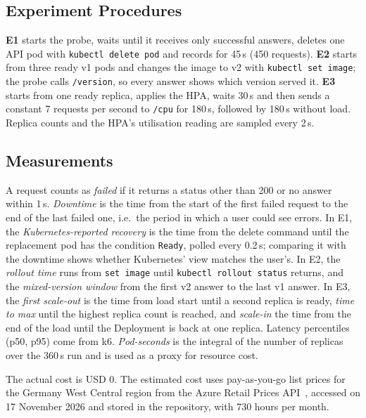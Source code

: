 \documentclass[conference,a4paper]{IEEEtran}
\begin{document}
\subsection{Experiment Procedures}
\textbf{E1} starts the probe, waits until it receives only successful answers, deletes one API pod with \texttt{kubectl delete pod} and records for 45\,s (450 requests). \textbf{E2} starts from three ready v1 pods and changes the image to v2 with \texttt{kubectl set image}; the probe calls \texttt{/version}, so every answer shows which version served it. \textbf{E3} starts from one ready replica, applies the HPA, waits 30\,s and then sends a constant 7 requests per second to \texttt{/cpu} for 180\,s, followed by 180\,s without load. Replica counts and the HPA's utilisation reading are sampled every 2\,s.

\subsection{Measurements}
A request counts as \emph{failed} if it returns a status other than 200 or no answer within 1\,s. \emph{Downtime} is the time from the start of the first failed request to the end of the last failed one, i.e.\ the period in which a user could see errors. In E1, the \emph{Kubernetes-reported recovery} is the time from the delete command until the replacement pod has the condition \texttt{Ready}, polled every 0.2\,s; comparing it with the downtime shows whether Kubernetes' view matches the user's. In E2, the \emph{rollout time} runs from \texttt{set image} until \texttt{kubectl rollout status} returns, and the \emph{mixed-version window} from the first v2 answer to the last v1 answer. In E3, the \emph{first scale-out} is the time from load start until a second replica is ready, \emph{time to max} until the highest replica count is reached, and \emph{scale-in} the time from the end of the load until the Deployment is back at one replica. Latency percentiles (p50, p95) come from k6. \emph{Pod-seconds} is the integral of the number of replicas over the 360\,s run and is used as a proxy for resource cost.

The actual cost is USD 0. The estimated cost uses pay-as-you-go list prices for the Germany West Central region from the Azure Retail Prices API~\cite{azprices}, accessed on 17 November 2026 and stored in the repository, with 730 hours per month.
\end{document}

